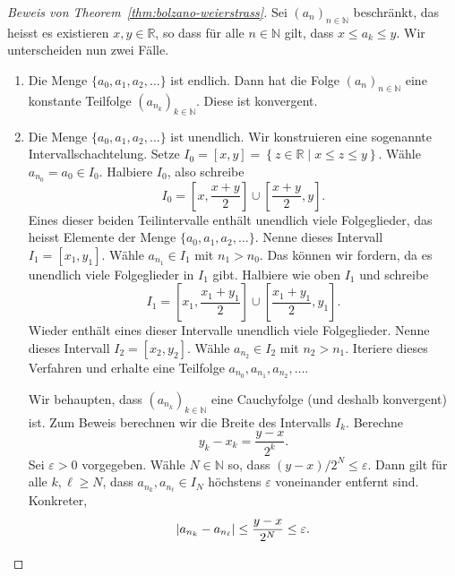 \documentclass[../main.tex]{subfiles}
\begin{document}
\begin{proof}[Beweis von Theorem~\ref{thm:bolzano-weierstrass}]
  Sei ${(a_n)}_{n \in \mathbb{N}}$ beschränkt, das heisst
  es existieren $x, y \in \mathbb{R}$, so dass für
  alle $n \in \mathbb{N}$ gilt, dass $x \leq a_k \leq y$.
  Wir unterscheiden nun zwei Fälle.
  \begin{enumerate}[1.]
    \item Die Menge $\{a_0, a_1, a_2, \dots\}$ ist endlich.
      Dann hat die Folge ${(a_n)}_{n \in \mathbb{N}}$ 
      eine konstante Teilfolge
      ${(a_{n_k})}_{k \in \mathbb{N}}$.
      Diese ist konvergent.
    \item Die Menge $\{a_0, a_1, a_2, \dots\}$ ist unendlich.
      Wir konstruieren eine sogenannte Intervallschachtelung.
      Setze 
      \(
        I_0 = [x, y] = \left\{z \in \mathbb{R} 
        \mid x \leq z \leq y\right\}.
      \)
      Wähle $a_{n_0} = a_0 \in I_0$. Halbiere $I_0$, also
      schreibe
      \[
        I_0 = \left[ x, \frac{x+y}{2} \right] 
        \cup \left[ \frac{x+y}{2}, y \right].
      \]
      Eines dieser beiden Teilintervalle enthält
      unendlich viele Folgeglieder,
      das heisst Elemente der Menge
      $\{a_0, a_1, a_2, \dots\}$. Nenne dieses Intervall
      $I_1 = [x_1, y_1]$. Wähle $a_{n_1} \in I_1$
      mit $n_1 > n_0$. Das können wir fordern,
      da es unendlich viele Folgeglieder in 
      $I_1$ gibt.
      Halbiere wie oben $I_1$ und schreibe
      \[
        I_1 = \left[ x_1, \frac{x_1 + y_1}{2} \right] 
        \cup \left[ \frac{x_1 + y_1}{2}, y_1 \right].
      \]
      Wieder enthält eines dieser Intervalle
      unendlich viele Folgeglieder. Nenne dieses
      Intervall $I_2 = [x_2, y_2]$. Wähle
      $a_{n_2} \in I_2$ mit $n_{2} > n_1$.
      Iteriere dieses Verfahren und erhalte eine
      Teilfolge $a_{n_0}, a_{n_1}, a_{n_2}, \dots$.

      Wir behaupten, dass ${(a_{n_k})}_{k \in \mathbb{N}}$
      eine Cauchyfolge (und deshalb konvergent) ist.
      Zum Beweis berechnen wir die Breite des
      Intervalls $I_k$. Berechne
      \[
        y_k - x_k = \frac{y - x}{2^k}.
      \]
      Sei $\varepsilon > 0$ vorgegeben. Wähle
      $N \in \mathbb{N}$ so, dass
      \(
        (y-x)/{2^N} \leq \varepsilon.
      \)
      Dann gilt für alle $k, \ell \geq N$, dass
      $a_{n_k}, a_{n_\ell} \in I_N$ höchstens
      $\varepsilon$ voneinander entfernt sind.
      Konkreter,
      \[
        |a_{n_k} - a_{n_\ell}| 
        \leq \frac{y-x}{2^N} \leq \varepsilon. \qedhere
      \]
  \end{enumerate}
\end{proof}
\end{document}
